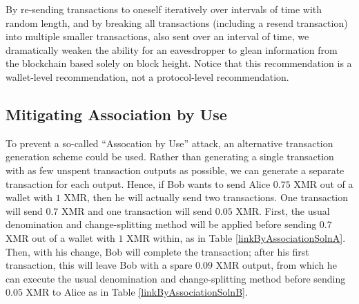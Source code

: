 \documentclass[12pt,english]{mrl}
\theoremstyle{definition}
\numberwithin{equation}{section}
\numberwithin{figure}{section}
\numberwithin{equation}{section}
\numberwithin{equation}{section}
\numberwithin{figure}{section}
\begin{document}
By re-sending transactions to oneself iteratively over intervals of time with random length, and by breaking all transactions (including a resend transaction) into multiple smaller transactions, also sent over an interval of time, we dramatically weaken the ability for an eavesdropper to glean information from the blockchain based solely on block height. Notice that this recommendation is a wallet-level recommendation, not a protocol-level recommendation.

\subsection{Mitigating Association by Use}\label{mitigAssoc}

To prevent a so-called ``Assocation by Use'' attack, an alternative transaction generation scheme could be used. Rather than generating a single transaction with as few unspent transaction outputs as possible, we can generate a separate transaction for each output. Hence, if Bob wants to send Alice $0.75$ XMR out of a wallet with $1$ XMR, then he will actually send two transactions. One transaction will send $0.7$ XMR and one transaction will send $0.05$ XMR.  First, the usual denomination and change-splitting method will be applied before sending $0.7$ XMR out of a wallet with $1$ XMR within, as in Table \ref{linkByAssociationSolnA}. Then, with his change, Bob will complete the transaction; after his first transaction, this will leave Bob with a spare $0.09$ XMR output, from which he can execute the usual denomination and change-splitting method before sending $0.05$ XMR to Alice as in Table \ref{linkByAssociationSolnB}.
\end{document}
